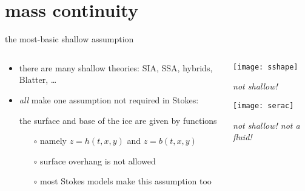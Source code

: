 
\section{mass continuity}

\begin{frame}{the most-basic shallow assumption}

\begin{columns}

\begin{column}{0.6\textwidth}
\begin{itemize}
\item there are many shallow theories: SIA, SSA, hybrids, Blatter, \dots
\item \emph{all} make one assumption not required in Stokes:

\begin{center}
\alert{the surface and base of the ice are given by functions}
\end{center}
    \begin{itemize}
    \item[$\circ$] namely $z=h(t,x,y)$ and $z=b(t,x,y)$
    \item[$\circ$] surface overhang is not allowed
    \item[$\circ$] most Stokes models make this assumption too
    \end{itemize}
\end{itemize}
\end{column}

\begin{column}{0.4\textwidth}
\texttt{[image: sshape]}

\scriptsize
\begin{center}
\emph{not shallow!}
\end{center}
\vspace{6mm}

\texttt{[image: serac]}

\begin{center}
\emph{not shallow! not a fluid!}
\end{center}
\end{column}
\end{columns}
\end{frame}


